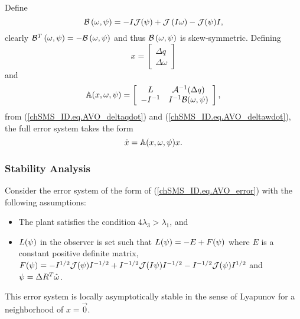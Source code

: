 %
%
Define  
%
\begin{equation} \label{chSMS_ID.eq.skewSymB}
\mathcal{B}\left(\omega,\psi\right)=
-I\mathcal{J}(\psi)+ \mathcal{J}\left(I \omega\right)-\mathcal{J}(\psi)I,
\end{equation}  
%
clearly $\mathcal{B}^T\left(\omega,\psi\right)=-
\mathcal{B}\left(\omega,\psi\right)$ and thus
$\mathcal{B}\left(\omega,\psi\right)$ is
skew-symmetric. Defining 
%
\begin{equation}
x=\left[\begin{array}{c}\Delta q \\ \Delta\omega\end{array}\right]
\end{equation}
%
and
%
\begin{equation}
\mathbb{A}(x,\omega,\psi)=
\left[ \begin{array}{cc}
     L   & \mathcal{A}^{-1}(\Delta q)                           \\
     -I^{-1}   & I^{-1}\mathcal{B}(\omega,\psi)                       \\
\end{array} \right],
\end{equation}
%
from (\ref{chSMS_ID.eq.AVO_deltaqdot}) and
(\ref{chSMS_ID.eq.AVO_deltawdot}), the full error system takes the
form
%
\begin{equation}\label{chSMS_ID.eq.AVO_error}
\dot{x} =\mathbb{A}(x,\omega,\psi)x.
\end{equation}
%
\subsubsection{Stability Analysis}%

\begin{SO3_AVO}
\label{chSMS_ID.theo.AVO_Theorem}
Consider the error system of the form of
  (\ref{chSMS_ID.eq.AVO_error}) with the following assumptions:
%
\begin{itemize}
\item The plant satisfies the condition $4\lambda_3>\lambda_1$, and
\item  $L(\psi)$ in the observer is set such that
$L(\psi)=-E+F(\psi)$ where $E$ is a constant positive
definite matrix, $F(\psi)=-I^{1/2}\mathcal{J}(\psi)I^{-1/2} +
I^{-1/2}\mathcal{J}(I\psi)I^{-1/2} - I^{-1/2}\mathcal{J}(\psi)I^{1/2}$
and $\psi=\Delta R^T\hat{\omega}$. %
\end{itemize}
%
This error system is locally asymptotically stable in the sense of
Lyapunov for a neighborhood of $x=\vec{0}$. %
\end{SO3_AVO}
%

